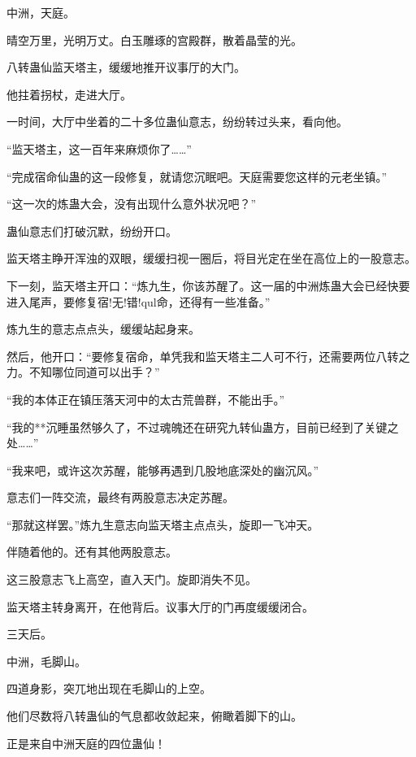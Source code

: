 
\begin{this_body}

中洲，天庭。

晴空万里，光明万丈。白玉雕琢的宫殿群，散着晶莹的光。

八转蛊仙监天塔主，缓缓地推开议事厅的大门。

他拄着拐杖，走进大厅。

一时间，大厅中坐着的二十多位蛊仙意志，纷纷转过头来，看向他。

“监天塔主，这一百年来麻烦你了……”

“完成宿命仙蛊的这一段修复，就请您沉眠吧。天庭需要您这样的元老坐镇。”

“这一次的炼蛊大会，没有出现什么意外状况吧？”

蛊仙意志们打破沉默，纷纷开口。

监天塔主睁开浑浊的双眼，缓缓扫视一圈后，将目光定在坐在高位上的一股意志。

下一刻，监天塔主开口：“炼九生，你该苏醒了。这一届的中洲炼蛊大会已经快要进入尾声，要修复宿!无!错!qul命，还得有一些准备。”

炼九生的意志点点头，缓缓站起身来。

然后，他开口：“要修复宿命，单凭我和监天塔主二人可不行，还需要两位八转之力。不知哪位同道可以出手？”

“我的本体正在镇压落天河中的太古荒兽群，不能出手。”

“我的**沉睡虽然够久了，不过魂魄还在研究九转仙蛊方，目前已经到了关键之处……”

“我来吧，或许这次苏醒，能够再遇到几股地底深处的幽沉风。”

意志们一阵交流，最终有两股意志决定苏醒。

“那就这样罢。”炼九生意志向监天塔主点点头，旋即一飞冲天。

伴随着他的。还有其他两股意志。

这三股意志飞上高空，直入天门。旋即消失不见。

监天塔主转身离开，在他背后。议事大厅的门再度缓缓闭合。

三天后。

中洲，毛脚山。

四道身影，突兀地出现在毛脚山的上空。

他们尽数将八转蛊仙的气息都收敛起来，俯瞰着脚下的山。

正是来自中洲天庭的四位蛊仙！


\end{this_body}
